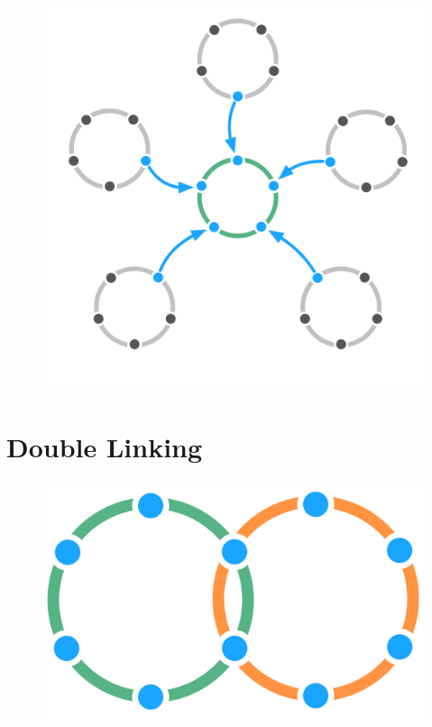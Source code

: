 \begin{figure}[htbp]
\centering
\includegraphics[keepaspectratio,width=\textwidth,height=0.75\textheight]{img/structural-patterns/delegate-circle.png}
\end{figure}

\section{Double Linking}
\label{doublelinking}

\begin{figure}[htbp]
\centering
\includegraphics[keepaspectratio,width=\textwidth,height=0.75\textheight]{img/structural-patterns/double-link.png}
\end{figure}


